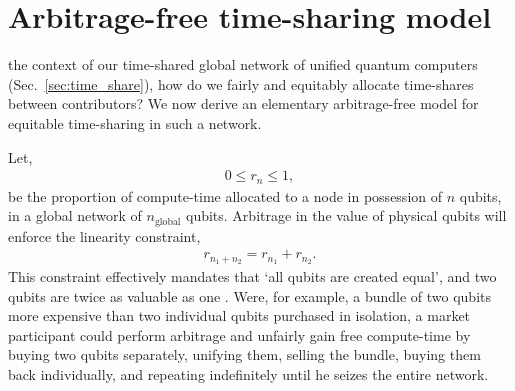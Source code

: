%
%

\section{Arbitrage-free time-sharing model}\label{sec:arb_free_time_share} 

 the context of our time-shared global network of unified quantum computers (Sec.~\ref{sec:time_share}), how do we fairly and equitably allocate time-shares between contributors? We now derive an elementary arbitrage-free model for equitable time-sharing in such a network.

Let,
\begin{align}
	0\leq r_n \leq 1,
\end{align}
be the proportion of compute-time allocated to a node in possession of $n$ qubits, in a global network of $n_\mathrm{global}$ qubits. Arbitrage in the value of physical qubits will enforce the linearity constraint,
\begin{align}
	r_{n_1+n_2} = r_{n_1} + r_{n_2}.
\end{align}
This constraint effectively mandates that `all qubits are created equal', and two qubits are twice as valuable as one . Were, for example, a bundle of two qubits more expensive than two individual qubits purchased in isolation, a market participant could perform arbitrage and unfairly gain free compute-time by buying two qubits separately, unifying them, selling the bundle, buying them back individually, and repeating indefinitely until he seizes the entire network.


